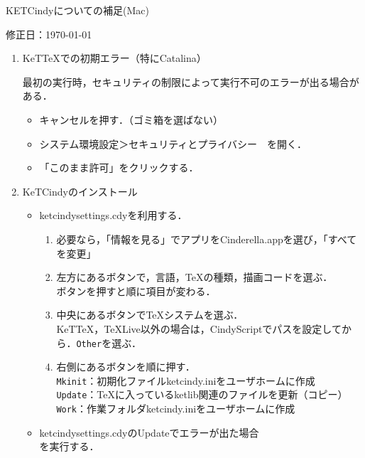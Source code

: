 \documentclass{ujarticle}
\begin{document}
\begin{center}
KETCindyについての補足(Mac)
\end{center}

\hfill 修正日：\today

\begin{enumerate}[\bf\large 1.]

\item KeTTeXでの初期エラー（特にCatalina）

\hspace*{2mm}最初の実行時，セキュリティの制限によって実行不可のエラーが出る場合がある．
    \begin{itemize}
   \item キャンセルを押す．（ゴミ箱を選ばない）
   \item システム環境設定＞セキュリティとプライバシー　を開く．
   \item 「このまま許可」をクリックする．
   \end{itemize}


\item KeTCindyのインストール
\begin{itemize}
\item ketcindysettings.cdyを利用する．
\begin{enumerate}[(1)]
\item 必要なら，「情報を見る」でアプリをCinderella.appを選び，「すべてを変更」
\item 左方にあるボタンで，言語，TeXの種類，描画コードを選ぶ．\\
\hspace*{10mm}ボタンを押すと順に項目が変わる．
\item 中央にあるボタンでTeXシステムを選ぶ．\\
\hspace*{10mm}KeTTeX，TeXLive以外の場合は，CindyScriptでパスを設定してから．\verb|Other|を選ぶ．
\item 右側にあるボタンを順に押す．\\
\hspace*{10mm}\verb|Mkinit|：初期化ファイルketcindy.iniをユーザホームに作成\\
\hspace*{10mm}\verb|Update|：TeXに入っているketlib関連のファイルを更新（コピー）\\
\hspace*{10mm}\verb|Work|：作業フォルダketcindy.iniをユーザホームに作成
\end{enumerate}
\item ketcindysettings.cdyのUpdateでエラーが出た場合\\
\hspace*{10mm}{\bf 1.}を実行する．
\end{itemize}


\end{enumerate}
\end{document}
